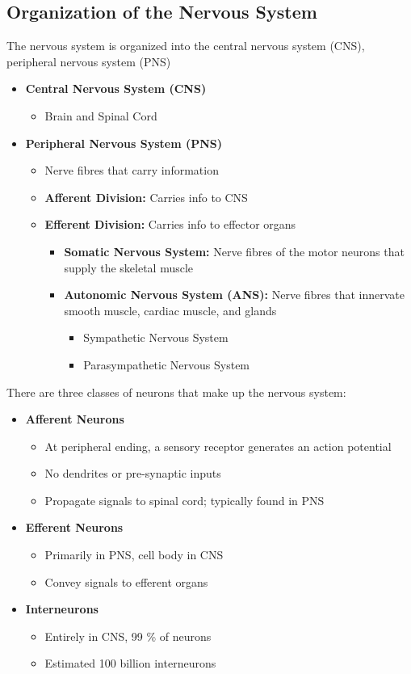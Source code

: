 \documentclass[11pt]{article}
\begin{document}
\subsection{Organization of the Nervous System}
The nervous system is organized into the central nervous system (CNS), peripheral nervous system (PNS)
\begin{itemize}
\item \textbf{Central Nervous System (CNS)}
\begin{itemize}
\item Brain and Spinal Cord
\end{itemize}
\item \textbf{Peripheral Nervous System (PNS)}
\begin{itemize}
\item Nerve fibres that carry information
\item \textbf{Afferent Division:} Carries info to CNS
\item\textbf{ Efferent Division: }Carries info to effector organs
\begin{itemize}
\item \textbf{Somatic Nervous System: } Nerve fibres of the motor neurons that supply the skeletal muscle
\item \textbf{Autonomic Nervous System (ANS): }Nerve fibres that innervate smooth muscle, cardiac muscle, and glands
\begin{itemize}
\item Sympathetic Nervous System
\item Parasympathetic Nervous System
\end{itemize}
\end{itemize}
\end{itemize}
\end{itemize}
There are three classes of neurons that make up the nervous system:
\begin{itemize}
\item \textbf{Afferent Neurons}
\begin{itemize}
\item At peripheral ending, a sensory receptor generates an action potential
\item No dendrites or pre-synaptic inputs
\item Propagate signals to spinal cord; typically found in PNS
\end{itemize}
\item\textbf{ Efferent Neurons}
\begin{itemize}
\item Primarily in PNS, cell body in CNS
\item Convey signals to efferent organs
\end{itemize}
\item \textbf{Interneurons}
\begin{itemize}
\item Entirely in CNS, 99 \% of neurons
\item Estimated 100 billion interneurons
\end{itemize}
\end{itemize}
\end{document}
